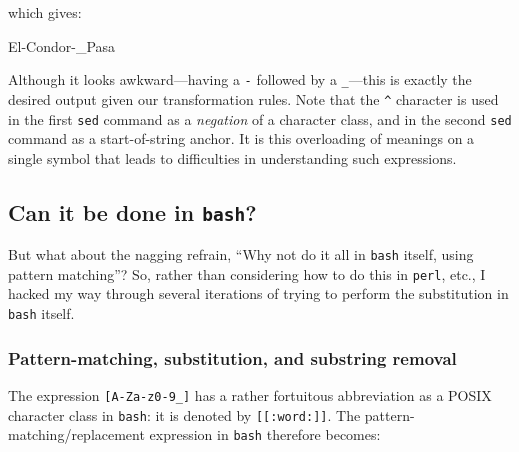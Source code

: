 \documentclass[
  a4paper,
]{article}
\newenvironment{Shaded}{\begin{snugshade}}{\end{snugshade}}
\newcommand{\ExtensionTok}[1]{\textcolor[rgb]{0.80,0.80,0.80}{#1}}
\begin{document}
which gives:

\begin{Shaded}
\begin{Highlighting}[]
\ExtensionTok{El{-}Condor{-}\_Pasa}
\end{Highlighting}
\end{Shaded}

Although it looks awkward---having a \texttt{-} followed by a
\texttt{\_}---this is exactly the desired output given our
transformation rules. Note that the \texttt{\^{}} character is used in
the first \texttt{sed} command as a \emph{negation} of a character
class, and in the second \texttt{sed} command as a start-of-string
anchor. It is this overloading of meanings on a single symbol that leads
to difficulties in understanding such expressions.

\hypertarget{can-it-be-done-in-bash}{%
\subsection{\texorpdfstring{Can it be done in
\texttt{bash}?}{Can it be done in bash?}}\label{can-it-be-done-in-bash}}

But what about the nagging refrain, ``Why not do it all in \texttt{bash}
itself, using pattern matching''? So, rather than considering how to do
this in \texttt{perl}, etc., I hacked my way through several iterations
of trying to perform the substitution in \texttt{bash} itself.

\hypertarget{pattern-matching-substitution-and-substring-removal}{%
\subsubsection{Pattern-matching, substitution, and substring
removal}\label{pattern-matching-substitution-and-substring-removal}}

The expression \texttt{{[}A-Za-z0-9\_{]}} has a rather fortuitous
abbreviation as a POSIX character class in \texttt{bash}: it is denoted
by \texttt{{[}{[}:word:{]}{]}}. The pattern-matching/replacement
expression in \texttt{bash} therefore becomes:
\end{document}
